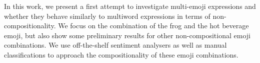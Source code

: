 In this work, we present a first attempt to investigate multi-emoji expressions and whether they behave similarly to multiword expressions in terms of non-compositionality. We focus on the combination of the frog and the hot beverage emoji, but also show some preliminary results for other non-compositional emoji combinations. We use off-the-shelf sentiment analysers as well as manual classifications to approach the compositionality of these emoji combinations.

